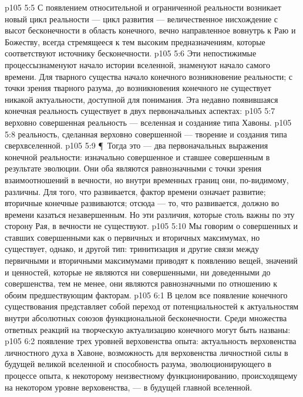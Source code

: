 \vs p105 5:5 С появлением относительной и ограниченной реальности возникает новый цикл реальности --- цикл развития --- величественное нисхождение с высот бесконечности в область конечного, вечно направленное вовнутрь к Раю и Божеству, всегда стремящееся к тем высоким предназначениям, которые соответствуют источнику бесконечности.
\vs p105 5:6 Эти непостижимые процессызнаменуют начало истории вселенной, знаменуют начало самого времени. Для тварного существа начало конечного  возникновение реальности; с точки зрения тварного разума, до возникновения конечного не существует никакой актуальности, доступной для понимания. Эта недавно появившаяся конечная реальность существует в двух первоначальных аспектах:
\vs p105 5:7 \bibnobreakspace {} верховно совершенная реальность --- вселенная и созданияе типа Хавоны.
\vs p105 5:8 \bibnobreakspace {} реальность, сделанная верховно совершенной --- творение и создания типа сверхвселенной.
\vs p105 5:9 \P\ Тогда это --- два первоначальных выражения конечной реальности: изначально совершенное и ставшее совершенным в результате эволюции. Они оба являются равнозначными с точки зрения взаимоотношений в вечности, но внутри временных границ они, по\hyp{}видимому, различны. Для того, что развивается, фактор времени означает развитие; вторичные конечные развиваются; отсюда --- то, что развивается, должно во времени казаться незавершенным. Но эти различия, которые столь важны по эту сторону Рая, в вечности не существуют.
\vs p105 5:10 Мы говорим о совершенных и ставших совершенными как о первичных и вторичных максимумах, но существует, однако, и другой тип: тринитизация и другие связи между первичными и вторичными максимумами приводят к появлению  вещей, значений и ценностей, которые не являются ни совершенными, ни доведенными до совершенства, тем не менее, они являются равнозначными по отношению к обоим предшествующим факторам.
\vs p105 6:1 В целом все появление конечного существования представляет собой переход от потенциальностей к актуальностям внутри абсолютных союзов функциональной бесконечности. Среди множества ответных реакций на творческую актуализацию конечного могут быть названы:
\vs p105 6:2 \bibnobreakspace {} появление трех уровней верховенства опыта: актуальность верховенства личностного духа в Хавоне, возможность для верховенства личностной силы в будущей великой вселенной и способность разума, эволюционирующего в процессе опыта, к некоторому неизвестному функционированию, происходящему на некотором уровне верховенства, --- в будущей главной вселенной.
